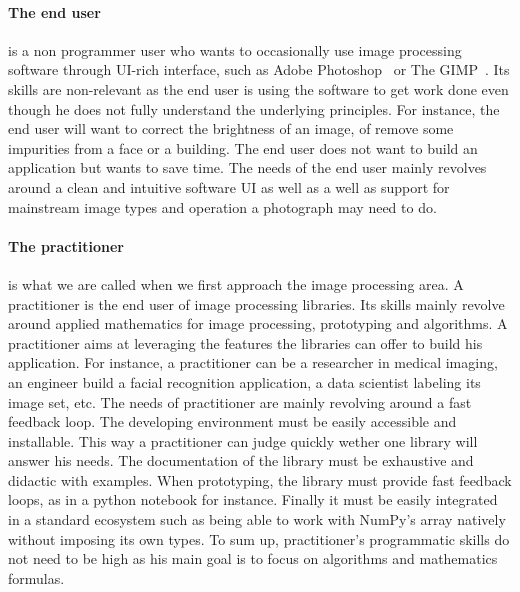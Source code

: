 \paragraph{The end user} is a non programmer user who wants to occasionally use image processing software through
UI-rich interface, such as Adobe Photoshop~\parencite{adobe.2019.photoshop} or The GIMP~\parencite{gimp.2019}. Its
skills are non-relevant as the end user is using the software to get work done even though he does not fully understand
the underlying principles. For instance, the end user will want to correct the brightness of an image, of remove some
impurities from a face or a building. The end user does not want to build an application but wants to save time. The
needs of the end user mainly revolves around a clean and intuitive software UI as well as a well as support for
mainstream image types and operation a photograph may need to do.

\paragraph{The practitioner} is what we are called when we first approach the image processing area. A practitioner is
the end user of image processing libraries. Its skills mainly revolve around applied mathematics for image processing,
prototyping and algorithms. A practitioner aims at leveraging the features the libraries can offer to build his
application. For instance, a practitioner can be a researcher in medical imaging, an engineer build a facial recognition
application, a data scientist labeling its image set, etc. The needs of practitioner are mainly revolving around a fast
feedback loop. The developing environment must be easily accessible and installable. This way a practitioner can judge
quickly wether one library will answer his needs. The documentation of the library must be exhaustive and didactic with
examples. When prototyping, the library must provide fast feedback loops, as in a python notebook for instance. Finally
it must be easily integrated in a standard ecosystem such as being able to work with NumPy's array natively without
imposing its own types. To sum up, practitioner's programmatic skills do not need to be high as his main goal is to
focus on algorithms and mathematics formulas.

